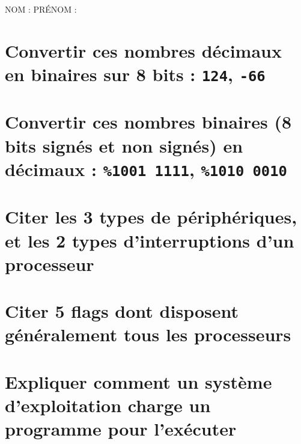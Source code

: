 \documentclass[11pt,a4paper]{article}
\author{Fabrice BOISSIER}
\begin{document}
\setlength{\fboxrule}{2pt}

\noindent {}

\bigskip

NOM : \hspace{6.5cm} PR\'ENOM :

\smallskip

\section{Convertir ces nombres décimaux en binaires sur 8 bits : \texttt{124}, \texttt{-66}}

\bigskip
\bigskip
\bigskip

\section{Convertir ces nombres binaires (8 bits signés et non signés) en décimaux : \texttt{\%1001 1111}, \texttt{\%1010 0010}}

\bigskip
\bigskip
\bigskip

\section{Citer les 3 types de périphériques, et les 2 types d'interruptions d'un processeur}

\bigskip
\bigskip
\bigskip
\bigskip
\bigskip

\section{Citer 5 flags dont disposent généralement tous les processeurs}

\bigskip
\bigskip
\bigskip
\bigskip
\bigskip

\section{Expliquer comment un système d'exploitation charge un programme pour l'exécuter}
\end{document}
